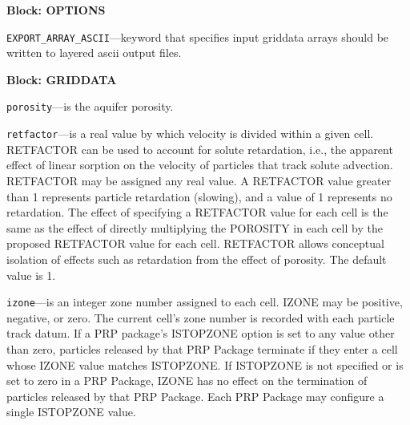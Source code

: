 
\item \textbf{Block: OPTIONS}

\begin{description}
\item \texttt{EXPORT\_ARRAY\_ASCII}---keyword that specifies input griddata arrays should be written to layered ascii output files.

\end{description}
\item \textbf{Block: GRIDDATA}

\begin{description}
\item \texttt{porosity}---is the aquifer porosity.

\item \texttt{retfactor}---is a real value by which velocity is divided within a given cell.  RETFACTOR can be used to account for solute retardation, i.e., the apparent effect of linear sorption on the velocity of particles that track solute advection.  RETFACTOR may be assigned any real value.  A RETFACTOR value greater than 1 represents particle retardation (slowing), and a value of 1 represents no retardation.  The effect of specifying a RETFACTOR value for each cell is the same as the effect of directly multiplying the POROSITY in each cell by the proposed RETFACTOR value for each cell.  RETFACTOR allows conceptual isolation of effects such as retardation from the effect of porosity.  The default value is 1.

\item \texttt{izone}---is an integer zone number assigned to each cell.  IZONE may be positive, negative, or zero.  The current cell's zone number is recorded with each particle track datum.  If a PRP package's ISTOPZONE option is set to any value other than zero, particles released by that PRP Package terminate if they enter a cell whose IZONE value matches ISTOPZONE.  If ISTOPZONE is not specified or is set to zero in a PRP Package, IZONE has no effect on the termination of particles released by that PRP Package.  Each PRP Package may configure a single ISTOPZONE value.

\end{description}

